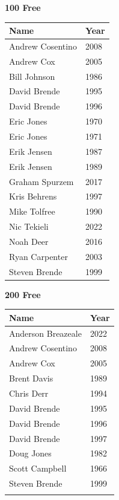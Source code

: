 \begin{minipage}[t]{0.48\textwidth}
\centering
\textbf{\textcolor{teamprimary}{100 Free}}\par
\vspace{0.5em}
\centering
\small
\renewcommand{\arraystretch}{1.0}
\setlength{\tabcolsep}{4pt}
\begin{tabular}{@{}p{3.0cm}p{1.0cm}@{}}
\toprule
\textbf{Name} & \textbf{Year} \\
\midrule
Andrew Cosentino & 2008 \\
Andrew Cox & 2005 \\
Bill Johnson & 1986 \\
David Brende & 1995 \\
David Brende & 1996 \\
Eric Jones & 1970 \\
Eric Jones & 1971 \\
Erik Jensen & 1987 \\
Erik Jensen & 1989 \\
Graham Spurzem & 2017 \\
Kris Behrens & 1997 \\
Mike Tolfree & 1990 \\
Nic Tekieli & 2022 \\
Noah Deer & 2016 \\
Ryan Carpenter & 2003 \\
Steven Brende & 1999 \\
\bottomrule
\end{tabular}
\end{minipage}
\vspace{0.5em}
\noindent\begin{minipage}[t]{0.48\textwidth}
\centering
\textbf{\textcolor{teamprimary}{200 Free}}\par
\vspace{0.5em}
\centering
\small
\renewcommand{\arraystretch}{1.0}
\setlength{\tabcolsep}{4pt}
\begin{tabular}{@{}p{3.0cm}p{1.0cm}@{}}
\toprule
\textbf{Name} & \textbf{Year} \\
\midrule
Anderson Breazeale & 2022 \\
Andrew Cosentino & 2008 \\
Andrew Cox & 2005 \\
Brent Davis & 1989 \\
Chris Derr & 1994 \\
David Brende & 1995 \\
David Brende & 1996 \\
David Brende & 1997 \\
Doug Jones & 1982 \\
Scott Campbell & 1966 \\
Steven Brende & 1999 \\
\bottomrule
\vspace{0.5em}
\end{tabular}
\end{minipage}
